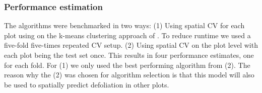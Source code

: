 \documentclass[review]{elsarticle}
\begin{document}




\subsubsection{Performance estimation}

The algorithms were benchmarked in two ways:
(1) Using spatial \ac{CV} for each plot using on the k-means clustering approach of \cite{Brenning2012}. To reduce runtime we used a five-fold five-times repeated CV setup.
(2) Using spatial \ac{CV} on the plot level with each plot being the test set once. This results in four performance estimates, one for each fold.
For (1) we only used the best performing algorithm from (2).
The reason why the (2) was chosen for algorithm selection is that this model will also be used to spatially predict defoliation in other plots.
\end{document}
